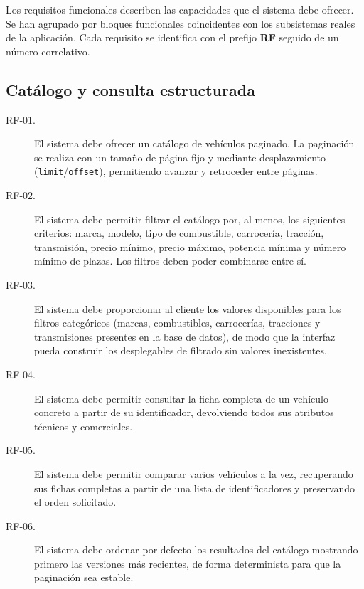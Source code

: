 Los requisitos funcionales describen las capacidades que el sistema debe
ofrecer. Se han agrupado por bloques funcionales coincidentes con los
subsistemas reales de la aplicación. Cada requisito se identifica con el
prefijo \textbf{RF} seguido de un número correlativo.

\subsection{Catálogo y consulta estructurada}

\begin{description}
  \item[RF-01.] El sistema debe ofrecer un catálogo de vehículos paginado. La
        paginación se realiza con un tamaño de página fijo y mediante
        desplazamiento (\texttt{limit}/\texttt{offset}), permitiendo avanzar y
        retroceder entre páginas.

  \item[RF-02.] El sistema debe permitir filtrar el catálogo por, al menos, los
        siguientes criterios: marca, modelo, tipo de combustible, carrocería,
        tracción, transmisión, precio mínimo, precio máximo, potencia mínima y
        número mínimo de plazas. Los filtros deben poder combinarse entre sí.

  \item[RF-03.] El sistema debe proporcionar al cliente los valores disponibles
        para los filtros categóricos (marcas, combustibles, carrocerías,
        tracciones y transmisiones presentes en la base de datos), de modo que
        la interfaz pueda construir los desplegables de filtrado sin valores
        inexistentes.

  \item[RF-04.] El sistema debe permitir consultar la ficha completa de un
        vehículo concreto a partir de su identificador, devolviendo todos sus
        atributos técnicos y comerciales.

  \item[RF-05.] El sistema debe permitir comparar varios vehículos a la vez,
        recuperando sus fichas completas a partir de una lista de
        identificadores y preservando el orden solicitado.

  \item[RF-06.] El sistema debe ordenar por defecto los resultados del catálogo
        mostrando primero las versiones más recientes, de forma determinista
        para que la paginación sea estable.
\end{description}

